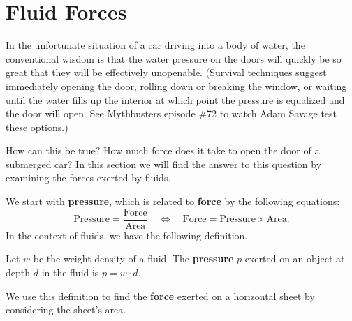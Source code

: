 \section{Fluid Forces}\label{sec:fluid_force}

In the unfortunate situation of a car driving into a body of water, the conventional wisdom is that the water pressure on the doors will quickly be so great that they will be effectively unopenable. (Survival techniques suggest immediately opening the door, rolling down or breaking the window, or waiting until the water fills up the interior at which point the pressure is equalized and the door will open. See Mythbusters episode \#72 to watch Adam Savage test these options.)

How can this be true? How much force does it take to open the door of a submerged car? In this section we will find the answer to this question by examining the forces exerted by fluids.

We start with \textbf{pressure}, which is related to \textbf{force} by the following equations:
\[
\text{Pressure} = \frac{\text{Force}}{\text{Area}}
\quad  \Leftrightarrow \quad
\text{Force} = \text{Pressure}\times\text{Area}.
\]
In the context of fluids, we have the following definition.

{Let $w$ be the weight-density of a fluid. The \textbf{pressure} $p$ exerted on an object at depth $d$ in the fluid is $p = w\cdot d.$
}

We use this definition to find the \textbf{force} exerted on a horizontal sheet by considering the sheet's area.


